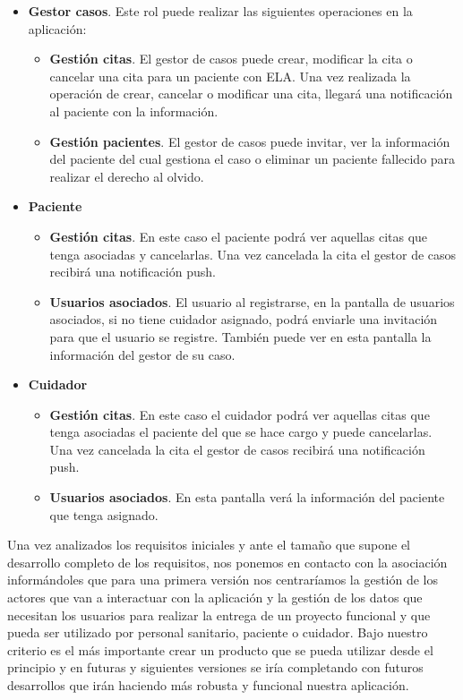 \begin{itemize}
\begin{itemize}
	\end{itemize}
\item \textbf{Gestor casos}. Este rol puede realizar las siguientes operaciones en la aplicación:
			\begin{itemize}
				\item \textbf{Gestión citas}. El gestor de casos puede crear, modificar la cita o cancelar una cita para un paciente con ELA. Una vez realizada la operación de crear, cancelar o modificar una cita, llegará una notificación al paciente con la información.
				\item \textbf{Gestión pacientes}. El gestor de casos puede invitar, ver la información del paciente del cual gestiona el caso o eliminar un paciente fallecido para realizar el derecho al olvido.
			\end{itemize}
\item \textbf{Paciente}
			\begin{itemize}
				\item \textbf{Gestión citas}. En este caso el paciente podrá ver aquellas citas que tenga asociadas y cancelarlas. Una vez cancelada la cita el gestor de casos recibirá una notificación push.
				\item \textbf{Usuarios asociados}. El usuario al registrarse, en la pantalla de usuarios asociados, si no tiene cuidador asignado, podrá enviarle una invitación para que el usuario se registre. También puede ver en esta pantalla la información del gestor de su caso.
			\end{itemize}
\item \textbf{Cuidador}
			\begin{itemize}
				\item \textbf{Gestión citas}. En este caso el cuidador podrá ver aquellas citas que tenga asociadas el paciente del que se hace cargo y puede cancelarlas. Una vez cancelada la cita el gestor de casos recibirá una notificación push.
				\item \textbf{Usuarios asociados}. En esta pantalla verá la información del paciente que tenga asignado.
			\end{itemize}
\end{itemize}

Una vez analizados los requisitos iniciales y ante el tamaño que supone el desarrollo completo de los requisitos, nos ponemos en contacto con la asociación informándoles que para una primera versión nos centraríamos la gestión de los actores que van a interactuar con la aplicación y la gestión de los datos que necesitan los usuarios para realizar la entrega de un proyecto funcional y que pueda ser utilizado por personal sanitario, paciente o cuidador. 
Bajo nuestro criterio es el más importante crear un producto que se pueda utilizar desde el principio y en futuras y siguientes versiones se iría completando con futuros desarrollos que irán haciendo más robusta y funcional nuestra aplicación.

